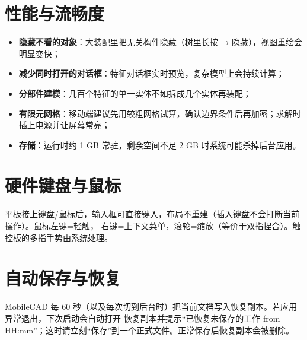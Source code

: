\section{性能与流畅度}

\begin{itemize}
  \item \textbf{隐藏不看的对象}：大装配里把无关构件隐藏（树里长按 → 隐藏），视图重绘会明显变快；
  \item \textbf{减少同时打开的对话框}：特征对话框实时预览，复杂模型上会持续计算；
  \item \textbf{分部件建模}：几百个特征的单一实体不如拆成几个实体再装配；
  \item \textbf{有限元网格}：移动端建议先用较粗网格试算，确认边界条件后再加密；求解时插上电源并让屏幕常亮；
  \item \textbf{存储}：运行时约 1 GB 常驻，剩余空间不足 2 GB 时系统可能杀掉后台应用。
\end{itemize}

\section{硬件键盘与鼠标}

平板接上键盘/鼠标后，输入框可直接键入，布局不重建（插入键盘不会打断当前操作）。鼠标左键=轻触，
右键=上下文菜单，滚轮=缩放（等价于双指捏合）。触控板的多指手势由系统处理。

\section{自动保存与恢复}

MobileCAD 每 60 秒（以及每次切到后台时）把当前文档写入恢复副本。若应用异常退出，下次启动会自动打开
恢复副本并提示“已恢复未保存的工作 from HH:mm”；这时请立刻“保存”到一个正式文件。正常保存后恢复副本会被删除。
